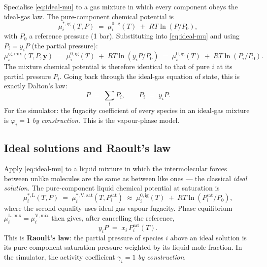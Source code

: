 \documentclass[11pt,a4paper]{article}
\begin{document}
Specialise \eqref{eq:ideal-mu} to a gas mixture in which every
component obeys the ideal-gas law.  The pure-component chemical
potential is
\begin{equation}
   \mu_i^{*,\mathrm{ig}}(T, P) \;=\; \mu_i^{0,\mathrm{ig}}(T)
                                \;+\; RT \ln(P/P_0),
\end{equation}
with $P_0$ a reference pressure (1 bar).  Substituting into
\eqref{eq:ideal-mu} and using $P_i = y_i P$ (the partial pressure):
\begin{equation}
   \mu_i^{\mathrm{ig,mix}}(T, P, \mathbf{y})
   \;=\; \mu_i^{0,\mathrm{ig}}(T) \;+\; RT \ln(y_i P / P_0)
   \;=\; \mu_i^{0,\mathrm{ig}}(T) \;+\; RT \ln(P_i / P_0).
\end{equation}
The mixture chemical potential is therefore identical to that of
pure $i$ at its partial pressure $P_i$.  Going back through the
ideal-gas equation of state, this is exactly Dalton's law:
\begin{equation}
   P \;=\; \sum_i P_i, \qquad P_i \;=\; y_i P.
\end{equation}
For the simulator: the fugacity coefficient of every species in an
ideal-gas mixture is $\varphi_i = 1$ \emph{by construction}.  This
is the vapour-phase model.

\subsection{Ideal solutions and Raoult's law}

Apply \eqref{eq:ideal-mu} to a liquid mixture in which the
intermolecular forces between unlike molecules are the same as
between like ones --- the classical \emph{ideal solution}.  The
pure-component liquid chemical potential at saturation is
\begin{equation}
   \mu_i^{*,\mathrm{L}}(T, P) \;=\;
   \mu_i^{*,\mathrm{V,sat}}(T, P_i^{\mathrm{sat}})
   \;\approx\; \mu_i^{0,\mathrm{ig}}(T) \;+\; RT \ln(P_i^{\mathrm{sat}} / P_0),
\end{equation}
where the second equality uses ideal-gas vapour fugacity.  Phase
equilibrium $\mu_i^{\mathrm{L,mix}} = \mu_i^{\mathrm{V,mix}}$ then
gives, after cancelling the reference,
\begin{equation}
   \boxed{\;
   y_i P \;=\; x_i\, P_i^{\mathrm{sat}}(T).
   \;}
   \label{eq:raoult}
\end{equation}
This is \textbf{Raoult's law}: the partial pressure of species $i$
above an ideal solution is its pure-component saturation pressure
weighted by its liquid mole fraction.  In the simulator, the
activity coefficient $\gamma_i = 1$ \emph{by construction}.
\end{document}
